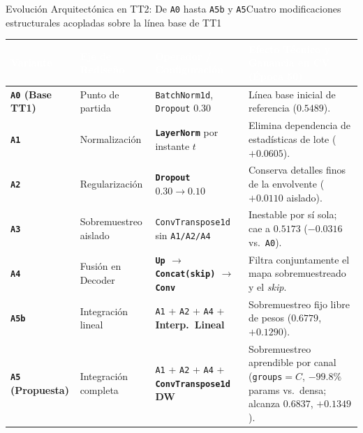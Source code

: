 
\begin{frame}{Evoluci\'on Arquitect\'onica en TT2: De \texttt{A0} hasta \texttt{A5b} y \texttt{A5}}{Cuatro modificaciones estructurales acopladas sobre la l\'inea base de TT1 \cite{ronneberger2015unet,rodas_valencia_tpe_ecog}}
  \centering
  \scriptsize
  \renewcommand{\arraystretch}{1.18}
  \setlength{\tabcolsep}{4.5pt}
  \begin{tabularx}{\textwidth}{@{} l l l >{\raggedright\arraybackslash}X @{}}
    \toprule
    \rowcolor{ipnDark}
    \textcolor{white}{\textbf{Variante}} &
    \textcolor{white}{\textbf{Eje de Redise\~no}} &
    \textcolor{white}{\textbf{Operador / Configuraci\'on}} &
    \textcolor{white}{\textbf{Efecto T\'ecnico y Ganancia en CV (\'Epoca 50)}} \\
    \midrule
    \textbf{\texttt{A0} (Base TT1)} & Punto de partida & \texttt{BatchNorm1d}, \texttt{Dropout} $0.30$ & L\'inea base inicial de referencia ($\mathbf{0.5489}$). \\
    \rowcolor{rowLight}
    \textbf{\texttt{A1}} & Normalizaci\'on & \textbf{\texttt{LayerNorm}} por instante $t$ & Elimina dependencia de estad\'isticas de lote ($\mathbf{+0.0605}$). \\
    \textbf{\texttt{A2}} & Regularizaci\'on & \textbf{\texttt{Dropout}} $0.30 \rightarrow \mathbf{0.10}$ & Conserva detalles finos de la envolvente ($\mathbf{+0.0110}$ aislado). \\
    \rowcolor{rowLight}
    \textbf{\texttt{A3}} & Sobremuestreo aislado & \texttt{ConvTranspose1d} sin \texttt{A1/A2/A4} & Inestable por s\'i sola; cae a $0.5173$ ($\mathbf{-0.0316}$ vs.\ \texttt{A0}). \\
    \textbf{\texttt{A4}} & Fusi\'on en Decoder & \textbf{\texttt{Up} $\to$ \texttt{Concat(skip)} $\to$ \texttt{Conv}} & Filtra conjuntamente el mapa sobremuestreado y el \textit{skip}. \\
    \rowcolor{rowLight}
    \textbf{\texttt{A5b}} & Integraci\'on lineal & \texttt{A1} + \texttt{A2} + \texttt{A4} + \textbf{Interp.\ Lineal} & Sobremuestreo fijo libre de pesos ($\mathbf{0.6779}$, $+0.1290$). \\
    \rowcolor{rowHighlight}
    \textbf{\texttt{A5} (Propuesta)} & Integraci\'on completa & \texttt{A1} + \texttt{A2} + \texttt{A4} + \textbf{\texttt{ConvTranspose1d} DW} & Sobremuestreo aprendible por canal (\texttt{groups}$=C$, $-99.8\%$ params vs.\ densa; alcanza $\mathbf{0.6837}$, $\mathbf{+0.1349}$). \\
    \bottomrule
  \end{tabularx}


\end{frame}
